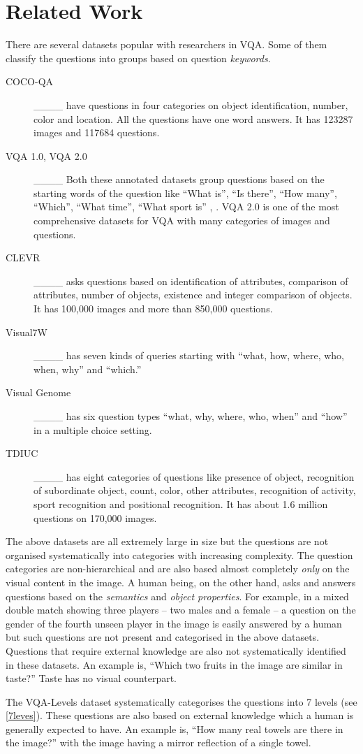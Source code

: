 \section{Related Work}
\label{sec:relatedWork}
There are several datasets popular with researchers in VQA. Some of
them classify the questions into groups based on question
\emph{keywords}. 
\begin{description}
\item[COCO-QA]____ have questions in four categories on
  object identification, number, color and location. All the questions
  have one word answers. It has 123287 images and 117684 questions.
\item[VQA 1.0, VQA 2.0]____ Both these
  annotated datasets group questions based on the starting words of
  the question like ``What is'', ``Is there'', ``How many'',
  ``Which'', ``What time'', ``What sport is'' , \etc. VQA 2.0 is one
  of the most comprehensive datasets for VQA with many categories of
  images and questions.
\item[CLEVR]____ asks questions based on identification
  of attributes,  comparison of attributes, number of objects,
  existence and integer comparison of objects. It has 100,000 images
  and more than 850,000 questions. 
\item[Visual7W]____ has seven kinds of queries starting with
  ``what, how, where, who, when, why''  and ``which.''
\item[Visual Genome]____ has six question types ``what,
  why, where, who, when'' and ``how'' in a multiple
  choice setting.
\item[TDIUC]____ has eight categories of questions
  like presence of object, recognition of subordinate object, count,
  color, other attributes, recognition of activity, sport recognition
  and positional recognition. It has about 1.6 million questions on
  170,000 images.
\end{description}
The above datasets are all extremely large in size but the questions
are not organised systematically into categories with increasing
complexity. The question categories are non-hierarchical and are also
based almost completely \emph{only} on the visual content in the
image. A human being, on the other hand, asks and answers questions
based on the \emph{semantics} and \emph{object properties}. For
example, in a mixed double match showing three players -- two males
and a female -- a question on the gender of the fourth unseen player
in the image is easily answered by a human but such questions are not
present and categorised in the above datasets. Questions that require
external knowledge are also not systematically identified in these
datasets. An example is, ``Which two fruits in the image are similar
in taste?'' Taste has no visual counterpart.

The VQA-Levels dataset systematically categorises the questions into 7
levels (see \cref{7leves}). These questions are also based on
external knowledge which a human is generally expected to have. An
example is, ``How many real towels are there in the image?'' with the
image having a mirror reflection of a single towel.